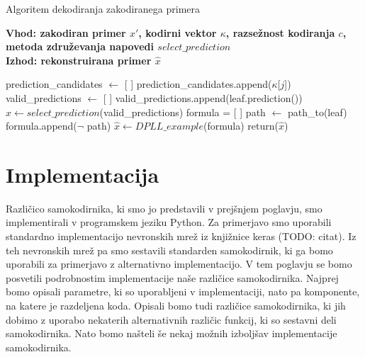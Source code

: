 \documentclass[12pt,a4paper]{article}
\begin{document}
\begin{algorithm}[h!]
	\caption{Algoritem dekodiranja zakodiranega primera}
	\label{algoritem-decode}
	\raggedright
	\textbf{Vhod: zakodiran primer $x'$, kodirni vektor $\kappa$, razsežnost kodiranja $c$, metoda združevanja napovedi $select\_prediction$}  \\
	\textbf{Izhod: rekonstruirana primer $\hat{x}$} 
	\begin{algorithmic}[1]
			\State prediction\_candidates $\gets$ [ ]
				\State prediction\_candidates.append($\kappa$[$j$])
			\EndIf
		\EndFor
			\State valid\_predictions $\gets$ [ ]
				\State valid\_predictions.append(leaf.prediction())
			\EndFor
			\State $\hat{x} \gets select\_prediction$(valid\_predictions) 
		\Else
			\State formula = [ ]
				\State path $\gets$ path\_to(leaf)
				\State formula.append($\lnot$ path)
			\EndFor
			\State $\hat{x} \gets DPLL\_example$(formula)
		\EndIf
		\State return($\hat{x}$)
	\end{algorithmic}
\end{algorithm}



\section{Implementacija}

Različico samokodirnika, ki smo jo predstavili v prejšnjem poglavju, smo implementirali v programskem jeziku Python.
Za primerjavo smo uporabili standardno implementacijo nevronskih mrež iz knjižnice keras (TODO: citat). %
Iz teh nevronskih mrež pa smo sestavili standarden samokodirnik, ki ga bomo uporabili za primerjavo z alternativno implementacijo.
V tem poglavju se bomo posvetili podrobnostim implementacije naše različice samokodirnika.
Najprej bomo opisali parametre, ki so uporabljeni v implementaciji, nato pa komponente, na katere je razdeljena koda.
Opisali bomo tudi različice samokodirnika, ki jih dobimo z uporabo nekaterih alternativnih različic funkcij, ki so sestavni deli samokodirnika.
Nato bomo našteli še nekaj možnih izboljšav implementacije samokodirnika.
\end{document}
